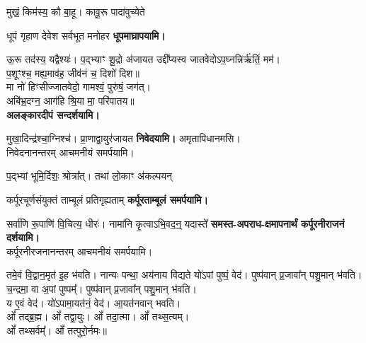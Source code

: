 \begin{center}

{मुखं॒ किम॑स्य॒ कौ बा॒हू। कावू॒रू पादा॑वुच्येते}

{धूपं गृहाण देवेश सर्वभूत मनोहर}
\textbf{\devAya{} धूपमाघ्रापयामि।}
\medskip

{ऊ॒रू तद॑स्य॒ यद्वैश्यः॑। प॒द्भ्याꣳ शू॒द्रो अ॑जायत}
उद्दी᳚प्यस्व जातवेदोऽप॒घ्नन्निर्ऋ॑तिं॒ मम॑।\\
प॒शूꣳश्च॒ मह्य॒माव॑ह॒ जीव॑नं च॒ दिशो॑ दिश॥\\
मा नो॑ हिꣳसीज्जातवेदो॒ गामश्वं॒ पुरु॑षं॒ जग॑त्।\\
अबि॑भ्र॒दग्न॒ आग॑हि श्रि॒या मा॒ परि॑पातय॥\\
\textbf{\devAya{} अलङ्कारदीपं सन्दर्शयामि।}
\medskip

{मुखा॒दिन्द्र॑श्चा॒ग्निश्च॑। प्रा॒णाद्वा॒युर॑जायत}
\textbf{\devAya{} \blank{} निवेदयामि।} अमृतापिधानमसि।\\
निवेदनानन्तरम् आचमनीयं समर्पयामि।\medskip

{प॒द्भ्यां भूमि॒र्दिशः॒ श्रोत्रा᳚त्। तथा॑ लो॒काꣳ अ॑कल्पयन्}

{कर्पूरचूर्णसंयुक्तं ताम्बूलं प्रतिगृह्यताम्}
\textbf{\devAya{} कर्पूरताम्बूलं समर्पयामि।}
\medskip

{सर्वा॑णि रू॒पाणि॑ वि॒चित्य॒ धीरः॑। नामा॑नि कृ॒त्वाऽभि॒वद॒न्॒ यदास्ते᳚}
\textbf{\devAya{} समस्त-अपराध-क्षमापनार्थं कर्पूरनीराजनं दर्शयामि।}\\
कर्पूरनीरजनानन्तरम् आचमनीयं समर्पयामि।
\medskip

{तमे॒वं वि॒द्वान॒मृत॑ इ॒ह भ॑वति। नान्यः पन्था॒ अय॑नाय विद्यते}
यो॑ऽपां पुष्पं॒ वेद॑। पुष्प॑वान् प्र॒जावा᳚न् पशु॒मान् भ॑वति।\\
च॒न्द्रमा॒ वा अ॒पां पुष्पम्᳚। पुष्प॑वान् प्र॒जावा᳚न् पशु॒मान् भ॑वति।\\
य ए॒वं वेद॑। यो॑ऽपामा॒यत॑नं॒ वेद॑। आ॒यत॑नवान् भवति।\\

ओं᳚ तद्ब्र॒ह्म। ओं᳚ तद्वा॒युः। ओं᳚ तदा॒त्मा। ओं᳚ तथ्स॒त्यम्‌।\\
ओं᳚ तथ्सर्वम्᳚‌। ओं᳚ तत्पुरो॒र्नमः॥\\


\end{center}
